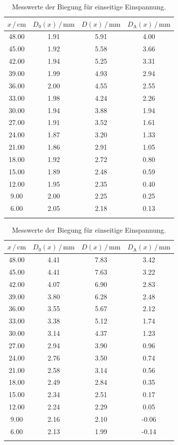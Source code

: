 \begin{table}
\centering
\caption{Messwerte der Biegung für einseitige Einspannung.}
\begin{tabular}[t]{cccc}
    \toprule
    $x\,/\,\si{\centi\meter}$ & $D_0(x) \,/\, \si{\milli\meter}$ & $D(x) \,/\, \si{\milli\meter}$ & $D_\text{A}(x) \,/\, \si{\milli\meter}$\\
    \midrule
    48.00 & 1.91 & 5.91 & 4.00 \\
    45.00 & 1.92 & 5.58 & 3.66 \\
    42.00 & 1.94 & 5.25 & 3.31 \\
    39.00 & 1.99 & 4.93 & 2.94 \\
    36.00 & 2.00 & 4.55 & 2.55 \\
    33.00 & 1.98 & 4.24 & 2.26 \\
    30.00 & 1.94 & 3.88 & 1.94 \\
    27.00 & 1.91 & 3.52 & 1.61 \\
    24.00 & 1.87 & 3.20 & 1.33 \\
    21.00 & 1.86 & 2.91 & 1.05 \\
    18.00 & 1.92 & 2.72 & 0.80 \\
    15.00 & 1.89 & 2.48 & 0.59 \\
    12.00 & 1.95 & 2.35 & 0.40 \\
    9.00 & 2.00 & 2.25 & 0.25 \\
    6.00 & 2.05 & 2.18 & 0.13 \\
    \bottomrule
    \label{tab:ein_eckig}
\end{tabular}
\begin{tabular}[t]{cccc}
    \toprule
    $x\,/\,\si{\centi\meter}$ & $D_0(x) \,/\, \si{\milli\meter}$ & $D(x) \,/\, \si{\milli\meter}$ & $D_\text{A}(x) \,/\, \si{\milli\meter}$\\
    \midrule
    48.00 & 4.41 & 7.83 & 3.42 \\
    45.00 & 4.41 & 7.63 & 3.22 \\
    42.00 & 4.07 & 6.90 & 2.83 \\
    39.00 & 3.80 & 6.28 & 2.48 \\
    36.00 & 3.55 & 5.67 & 2.12 \\
    33.00 & 3.38 & 5.12 & 1.74 \\
    30.00 & 3.14 & 4.37 & 1.23 \\
    27.00 & 2.94 & 3.90 & 0.96 \\
    24.00 & 2.76 & 3.50 & 0.74 \\
    21.00 & 2.58 & 3.14 & 0.56 \\
    18.00 & 2.49 & 2.84 & 0.35 \\
    15.00 & 2.34 & 2.51 & 0.17 \\
    12.00 & 2.24 & 2.29 & 0.05 \\
    9.00 & 2.16 & 2.10 & -0.06 \\
    6.00 & 2.13 & 1.99 & -0.14 \\
    \bottomrule
    \label{tab:ein_rund}
\end{tabular}
\label{tab:einseitig_komplett}
\end{table}

